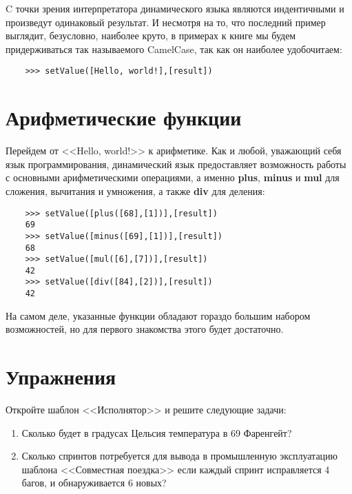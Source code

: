 \documentclass[../index.tex]{subfiles}
\begin{document}
	C точки зрения интерпретатора динамического языка являются индентичными и произведут одинаковый результат. И несмотря на то, что последний пример выглядит, безусловно, наиболее круто, в примерах к книге мы будем придерживаться так называемого CamelCase, так как он наиболее удобочитаем:
	
	\begin{verbatim}
	>>> setValue([Hello, world!],[result])
	\end{verbatim}
	
	\section{Арифметические функции}
	
	Перейдем от <<Hello, world!>> к арифметике. Как и любой, уважающий себя язык программирования, динамический язык предоставляет возможность работы с основными арифметическими операциями, а именно {\bf plus}, {\bf minus} и {\bf mul} для сложения, вычитания и умножения, а также {\bf div} для деления:
	
	\begin{verbatim}
	>>> setValue([plus([68],[1])],[result])
	69
	>>> setValue([minus([69],[1])],[result])
	68
	>>> setValue([mul([6],[7])],[result])
	42
	>>> setValue([div([84],[2])],[result])
	42
	\end{verbatim}
	
	На самом деле, указанные функции обладают гораздо большим набором возможностей, но для первого знакомства этого будет достаточно. 
				
	\section{Упражнения}
	
	Откройте шаблон <<Исполнятор>> и решите следующие задачи:
	
	\begin{enumerate}
		\item Сколько будет в градусах Цельсия температура в 69 Фаренгейт?
		
		\item Сколько спринтов потребуется для вывода в промышленную эксплуатацию шаблона <<Совместная поездка>> если каждый спринт исправляется 4 багов, и обнаруживается 6 новых?
    \end{enumerate}
\end{document}
